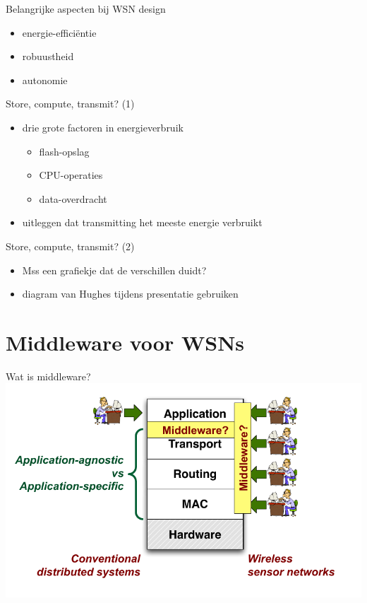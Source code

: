 \documentclass[presentation, bigger]{beamer}
\begin{document}
\begin{frame}[label=sec-1-6]{Belangrijke aspecten bij WSN design}
\begin{itemize}
\item energie-efficiëntie
\item robuustheid
\item autonomie
\end{itemize}
\end{frame}

\begin{frame}[label=sec-1-7]{Store, compute, transmit? (1)}
\begin{itemize}
\item drie grote factoren in energieverbruik
\begin{itemize}
\item flash-opslag
\item CPU-operaties
\item data-overdracht
\end{itemize}
\item uitleggen dat transmitting het meeste energie verbruikt
\end{itemize}
\end{frame}

\begin{frame}[label=sec-1-8]{Store, compute, transmit? (2)}
\begin{itemize}
\item Mss een grafiekje dat de verschillen duidt?
\item diagram van Hughes tijdens presentatie gebruiken
\end{itemize}
\end{frame}
\section{Middleware voor WSNs}
\label{sec-2}
\begin{frame}[label=sec-2-1]{Wat is middleware?}
\includegraphics[width=\textwidth,keepaspectration=true]{middleware}
\end{frame}
\end{document}
